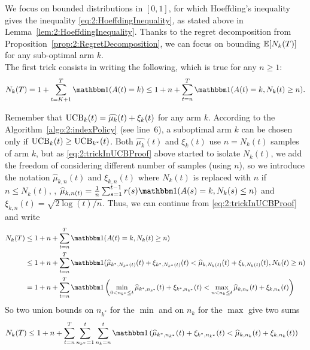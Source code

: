 \begin{smallproof}\label{proof:2:UCBregretBound}
    We focus on bounded distributions in $[0,1]$, for which Hoeffding's inequality gives the inequality \eqref{eq:2:HoeffdingInequality}, as stated above in Lemma~\ref{lem:2:HoeffdingInequality}.
    Thanks to the regret decomposition from Proposition~\ref{prop:2:RegretDecomposition}, we can focus on bounding $\mathbb{E}[N_k(T)]$ for any sub-optimal arm $k$.\\
    \indent
    The first trick consists in writing the following, which is true for any $n \geq 1$:
    \begin{equation}\label{eq:2:trickInUCBProof}
        N_k(T) = 1 + \sum_{t=K+1}^T \indic(A(t) = k)
        \leq 1 + n + \sum_{t=n}^T \indic(A(t) = k, N_k(t) \geq n).
    \end{equation}


    Remember that $\mathrm{UCB}_k(t) = \widehat{\mu_k}(t) + \xi_k(t)$ for any arm $k$.
    According to the Algorithm~\ref{algo:2:indexPolicy} (see line~6),
    a suboptimal arm $k$ can be chosen only if $\mathrm{UCB}_k(t) \geq \mathrm{UCB}_{k^*}(t)$.
    Both $\widehat{\mu_k}(t)$ and $\xi_k(t)$ use $n=N_k(t)$ samples of arm $k$,
    but as \eqref{eq:2:trickInUCBProof} above started to isolate $N_k(t)$, we add the freedom of considering different number of samples (using $n$), so we introduce the notation
    $\widehat{\mu}_{k,n}(t)$ and $\xi_{k,n}(t)$ where $N_k(t)$ is replaced with $n$ if $n \leq N_k(t)$,
    \ie, $\widehat{\mu}_{k,n(t)} = \frac{1}{n} \sum_{s=1}^{t-1} r(s) \indic(A(s)=k, N_k(s) \leq n)$ and $\xi_{k,n}(t) = \sqrt{2\log(t) / n}$.
    Thus, we can continue from \eqref{eq:2:trickInUCBProof} and write
    \begin{align}\label{eq:2:decompositionInUCBProof}
        N_k(T)
        & \leq 1 + n + \sum_{t=n}^T \indic(A(t) = k, N_k(t) \geq n) \nonumber \\
        & \leq 1 + n + \sum_{t=n}^T \indic(\widehat{\mu}_{k^*,N_{k^*}(t)}(t) + \xi_{k^*,N_{k^*}(t)}(t) < \widehat{\mu}_{k,N_k(t)}(t) + \xi_{k,N_k(t)}(t), N_k(t) \geq n)  \nonumber \\
        & = 1 + n + \sum_{t=n}^T \indic\left(\min_{0 < n_{k^*} \leq t} \widehat{\mu}_{k^*,n_{k^*}}(t) + \xi_{k^*,n_{k^*}}(t) < \max_{n < n_k \leq t} \widehat{\mu}_{k,n_k}(t) + \xi_{k,n_k}(t) \right)
    \end{align}
    So two union bounds on $n_{k^*}$ for the $\min$ and on $n_k$ for the $\max$ give two sums
    \begin{align}\label{eq:2:decompositionInUCBProof2}
        N_k(T)
        & \leq 1 + n + \sum_{t=n}^T \sum_{n_{k^*}=1}^t \sum_{n_{k}=n}^t  \indic\left( \widehat{\mu}_{k^*,n_{k^*}}(t) + \xi_{k^*,n_{k^*}}(t) < \widehat{\mu}_{k,n_k}(t) + \xi_{k,n_k}(t) \right)
    \end{align}


\end{smallproof}
